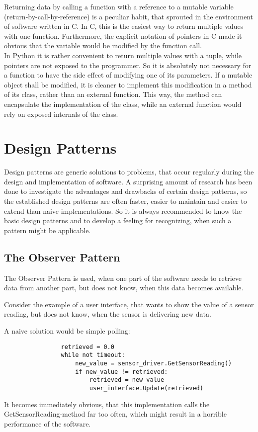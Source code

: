 		Returning data by calling a function with a reference to a mutable variable (return-by-call-by-reference) is a peculiar habit, that sprouted in the environment of software written in C.
		In C, this is the easiest way to return multiple values with one function.
		Furthermore, the explicit notation of pointers in C made it obvious that the variable would be modified by the function call.\\
		In Python it is rather convenient to return multiple values with a tuple, while pointers are not exposed to the programmer.
		So it is absolutely not necessary for a function to have the side effect of modifying one of its parameters.
		If a mutable object shall be modified, it is cleaner to implement this modification in a method of its class, rather than an external function.
		This way, the method can encapsulate the implementation of the class, while an external function would rely on exposed internals of the class.


	\section{Design Patterns}
		Design patterns are generic solutions to problems, that occur regularly during the design and implementation of software.
		A surprising amount of research has been done to investigate the advantages and drawbacks of certain design patterns, so the established design patterns are often faster, easier to maintain and easier to extend than naive implementations.
		So it is always recommended to know the basic design patterns and to develop a feeling for recognizing, when such a pattern might be applicable.

		\subsection{The Observer Pattern}
			\label{ObserverPattern}
			The Observer Pattern is used, when one part of the software needs to retrieve data from another part, but does not know, when this data becomes available.

			Consider the example of a user interface, that wants to show the value of a sensor reading, but does not know, when the sensor is delivering new data.

			A naive solution would be simple polling:
			\begin{verbatim}
				retrieved = 0.0
				while not timeout:
					new_value = sensor_driver.GetSensorReading()
					if new_value != retrieved:
						retrieved = new_value
						user_interface.Update(retrieved)
			\end{verbatim}
			It becomes immediately obvious, that this implementation calls the GetSensorReading-method far too often, which might result in a horrible performance of the software.


